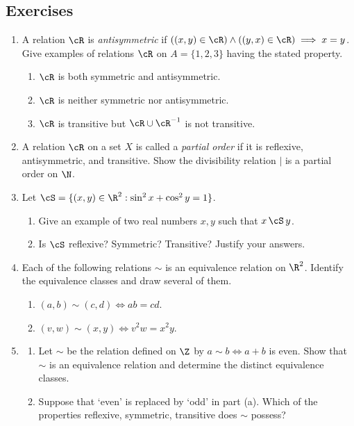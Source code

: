 \subsection*{Exercises}

\begin{enumerate}\renewcommand{\labelenumi}{\thesubsection.\theenumi}
	\item A relation $\cR$ is \emph{antisymmetric} if $((x,y)\in \cR)\wedge((y,x)\in \cR)\implies x=y$. Give examples of relations $\cR$ on $A=\{1,2,3\}$ having the stated property.
	\begin{enumerate}
		\item $\cR$ is both symmetric and antisymmetric.
		\item $\cR$ is neither symmetric nor antisymmetric.
		\item $\cR$ is transitive but $\cR\cup \cR^{-1}$ is not transitive.
	\end{enumerate}
	
	\item A relation $\cR$ on a set $X$ is called a \emph{partial order} if it is reflexive, antisymmetric, and transitive. Show the divisibility relation $\mid$ is a partial order on $\N$.
	
	\item Let $\cS=\{(x,y)\in\R^2:\sin^2x+\cos^2y=1\}$.
	\begin{enumerate}
	  \item Give an example of two real numbers $x,y$ such that $x\,\cS\,y$.
	  \item Is $\cS$ reflexive? Symmetric? Transitive? Justify your answers.
	\end{enumerate}

	\item Each of the following relations $\sim$ is an equivalence relation on $\R^2$. Identify the equivalence classes and draw several of them.
	\begin{enumerate}
		\item $(a,b)\sim(c,d)\iff ab=cd$.
	  \item $(v,w)\sim(x,y)\iff v^2w=x^2y$.
	\end{enumerate}
	
  \item\begin{enumerate}
  \item Let $\sim$ be the relation defined on $\Z$ by $a\sim b\iff a+b$ is even. Show that $\sim$ is an equivalence relation and determine the distinct equivalence classes.
  \item Suppose that `even' is replaced by `odd' in part (a). Which of the properties reflexive, symmetric, transitive does $\sim$ possess?
  \end{enumerate}


\end{enumerate}
